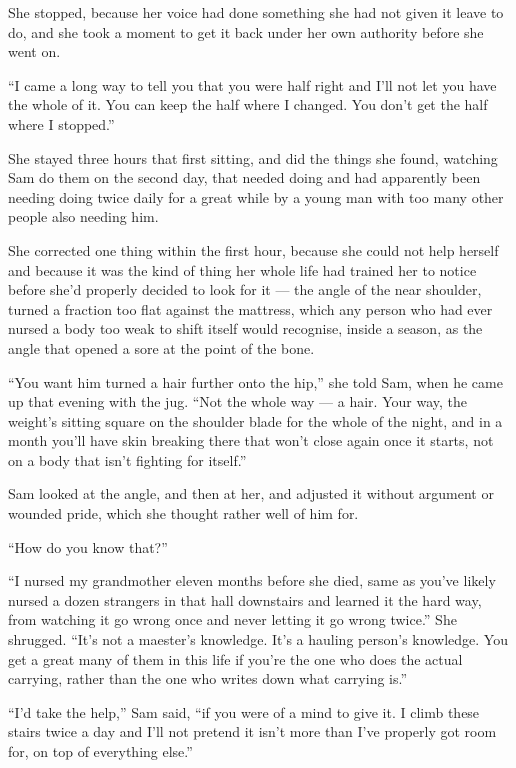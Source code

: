 She stopped, because her voice had done something she had not given it leave to do, and she took a moment to get it back under her own authority before she went on.

“I came a long way to tell you that you were half right and I’ll not let you have the whole of it. You can keep the half where I changed. You don’t get the half where I stopped.”

\sceneBreak

She stayed three hours that first sitting, and did the things she found, watching Sam do them on the second day, that needed doing and had apparently been needing doing twice daily for a great while by a young man with too many other people also needing him.

She corrected one thing within the first hour, because she could not help herself and because it was the kind of thing her whole life had trained her to notice before she’d properly decided to look for it — the angle of the near shoulder, turned a fraction too flat against the mattress, which any person who had ever nursed a body too weak to shift itself would recognise, inside a season, as the angle that opened a sore at the point of the bone.

“You want him turned a hair further onto the hip,” she told Sam, when he came up that evening with the jug. “Not the whole way — a hair. Your way, the weight’s sitting square on the shoulder blade for the whole of the night, and in a month you’ll have skin breaking there that won’t close again once it starts, not on a body that isn’t fighting for itself.”

Sam looked at the angle, and then at her, and adjusted it without argument or wounded pride, which she thought rather well of him for.

“How do you know that?”

“I nursed my grandmother eleven months before she died, same as you’ve likely nursed a dozen strangers in that hall downstairs and learned it the hard way, from watching it go wrong once and never letting it go wrong twice.” She shrugged. “It’s not a maester’s knowledge. It’s a hauling person’s knowledge. You get a great many of them in this life if you’re the one who does the actual carrying, rather than the one who writes down what carrying is.”

“I’d take the help,” Sam said, “if you were of a mind to give it. I climb these stairs twice a day and I’ll not pretend it isn’t more than I’ve properly got room for, on top of everything else.”

